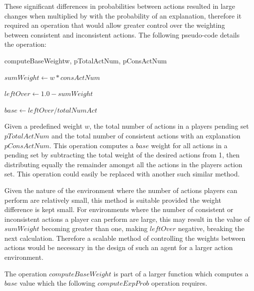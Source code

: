 \documentclass[parskip]{cs4rep}
\begin{document}
These significant differences in probabilities between actions resulted in large changes when multiplied by with the probability of an explanation, therefore it required an operation that would allow greater control over the weighting between consistent and inconsistent actions. The following pseudo-code details the operation:

\begin{pseudocode}[ruled]{computeBaseWeight}{w, pTotalActNum, pConsActNum}
\begin{algorithm}[H]

$sumWeight \gets w * consActNum$

$leftOver \gets 1.0 - sumWeight$

$base \gets leftOver / totalNumAct$

\end{algorithm}
\end{pseudocode}

Given a predefined weight $w$, the total number of actions in a players pending set $pTotalActNum$ and the total number of consistent actions with an explanation $pConsActNum$. This operation computes a $base$ weight for all actions in a pending set by subtracting the total weight of the desired actions from 1, then distributing equally the remainder amongst all the actions in the players action set. This operation could easily be replaced with another such similar method.

Given the nature of the environment where the number of actions players can perform are relatively small, this method is suitable provided the weight difference is kept small. For environments where the number of consistent or inconsistent actions a player can perform are large, this may result in the value of $sumWeight$ becoming greater than one, making $leftOver$ negative, breaking the next calculation. Therefore a scalable method of controlling the weights between actions would be necessary in the design of such an agent for a larger action environment.

The operation $computeBaseWeight$ is part of a larger function which computes a $base$ value which the following $computeExpProb$ operation requires.
\end{document}
